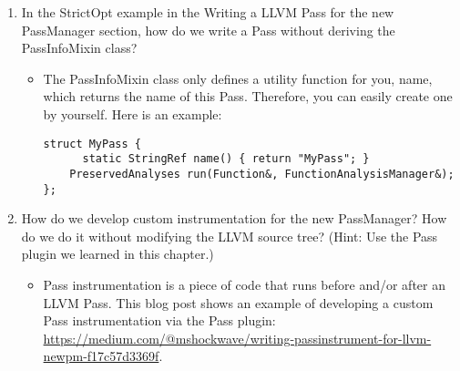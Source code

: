 \begin{enumerate}
\item In the StrictOpt example in the Writing a LLVM Pass for the new PassManager section, how do we write a Pass without deriving the PassInfoMixin class?

\begin{itemize}
\item The PassInfoMixin class only defines a utility function for you, name, which returns the name of this Pass. Therefore, you can easily create one by yourself. Here is an example:

\begin{lstlisting}[style=styleCXX]
struct MyPass {
	  static StringRef name() { return "MyPass"; }
	PreservedAnalyses run(Function&, FunctionAnalysisManager&);
};
\end{lstlisting}

\end{itemize}

\item How do we develop custom instrumentation for the new PassManager? How do we do it without modifying the LLVM source tree? (Hint: Use the Pass plugin we learned in this chapter.)

\begin{itemize}
\item Pass instrumentation is a piece of code that runs before and/or after an LLVM Pass. This blog post shows an example of developing a custom Pass instrumentation via the Pass plugin: \url{https://medium.com/@mshockwave/writing-passinstrument-for-llvm-newpm-f17c57d3369f}.
\end{itemize}

\end{enumerate}

